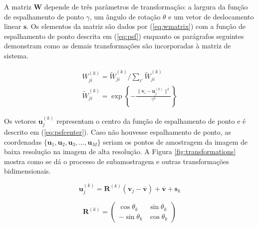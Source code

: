 A matriz $\mathbf{W}$ depende de três parâmetros de transformação: a largura da função de espalhamento de ponto $\gamma$, um ângulo de rotação $\theta$ e um vetor de deslocamento linear $\mathbf{s}$.
Os elementos da matriz são dados por (\ref{eq:wmatrix}) com a função de espalhamento de ponto descrita em (\ref{eq:psf}) enquanto os parágrafos seguintes demonstram como as demais transformações são incorporadas à matriz de sistema.

\begin{gather}
	\label{eq:wmatrix}
	W^{(k)}_{ji} = \widetilde{W}^{(k)}_{ji} / \sum_{i'} \widetilde{W}^{(k)}_{ji} \\
	\label{eq:psf}
	\widetilde{W}^{(k)}_{ji} = \exp \left\{- \frac{\|\mathbf{v}_i - \mathbf{u}^{(k)}_j\|^2}{\gamma^2} \right\}
\end{gather}

Os vetores $\mathbf{u}^{(k)}_j$ representam o centro da função de espalhamento de ponto e é descrito em (\ref{eq:psfcenter}).
Caso não houvesse espalhamento de ponto, as coordenadas $\{\mathbf{u}_1, \mathbf{u}_2,\mathbf{u}_3,..., \mathbf{u}_M\}$ seriam os pontos de amostragem da imagem de baixa resolução na imagem de alta resolução.
A Figura \ref{fig:transformations} mostra como se dá o processo de subamostragem e outras transformações bidimensionais.

\begin{equation}
	\label{eq:psfcenter}
	\mathbf{u}^{(k)}_j = \mathbf{R}^{(k)}(\mathbf{v}_j-\mathbf{\overline{v}})+\mathbf{\overline{v}}+\mathbf{s}_k
\end{equation}

\begin{equation}
	\mathbf{R}^{(k)} = 
	\begin{pmatrix}
		\cos \theta_k & \sin \theta_k \\
		- \sin \theta_k & \cos \theta_k
	\end{pmatrix}
\end{equation}


